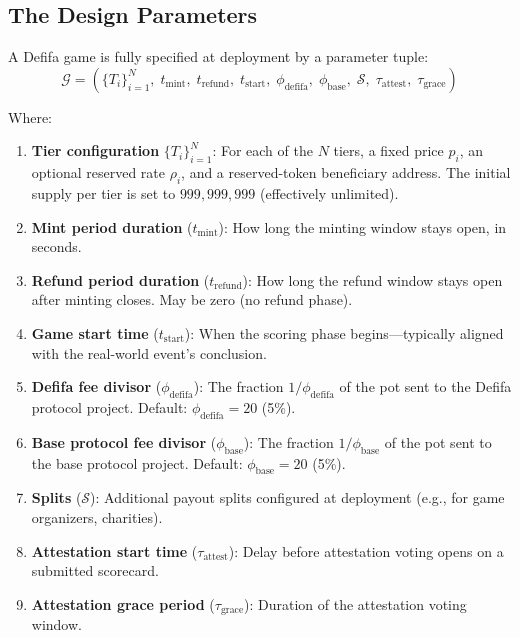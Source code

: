 \documentclass[11pt,a4paper]{article}
\begin{document}
\subsection{The Design Parameters}

A Defifa game is fully specified at deployment by a parameter tuple:
\begin{equation}
\mathcal{G} = \left( \{T_i\}_{i=1}^{N}, \; t_{\text{mint}}, \; t_{\text{refund}}, \; t_{\text{start}}, \; \phi_{\text{defifa}}, \; \phi_{\text{base}}, \; \mathcal{S}, \; \tau_{\text{attest}}, \; \tau_{\text{grace}} \right)
\end{equation}

Where:
\begin{enumerate}[nosep]
    \item \textbf{Tier configuration} $\{T_i\}_{i=1}^{N}$: For each of the $N$ tiers, a fixed price $p_i$, an optional reserved rate $\rho_i$, and a reserved-token beneficiary address. The initial supply per tier is set to $999{,}999{,}999$ (effectively unlimited).

    \item \textbf{Mint period duration} ($t_{\text{mint}}$): How long the minting window stays open, in seconds.

    \item \textbf{Refund period duration} ($t_{\text{refund}}$): How long the refund window stays open after minting closes. May be zero (no refund phase).

    \item \textbf{Game start time} ($t_{\text{start}}$): When the scoring phase begins---typically aligned with the real-world event's conclusion.

    \item \textbf{Defifa fee divisor} ($\phi_{\text{defifa}}$): The fraction $1/\phi_{\text{defifa}}$ of the pot sent to the Defifa protocol project. Default: $\phi_{\text{defifa}} = 20$ (5\%).

    \item \textbf{Base protocol fee divisor} ($\phi_{\text{base}}$): The fraction $1/\phi_{\text{base}}$ of the pot sent to the base protocol project. Default: $\phi_{\text{base}} = 20$ (5\%).

    \item \textbf{Splits} ($\mathcal{S}$): Additional payout splits configured at deployment (e.g., for game organizers, charities).

    \item \textbf{Attestation start time} ($\tau_{\text{attest}}$): Delay before attestation voting opens on a submitted scorecard.

    \item \textbf{Attestation grace period} ($\tau_{\text{grace}}$): Duration of the attestation voting window.
\end{enumerate}
\end{document}
